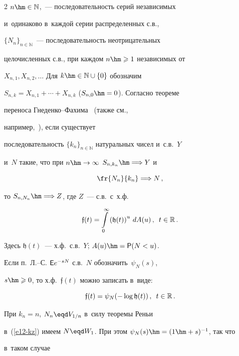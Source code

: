 \begin{multicols}{2}
$n\hm\in\mathbb{N}$,~--- последовательность серий независимых 


и~одинаково в~каждой серии распределенных с.в.,


$\{N_n\}_{n\in\mathbb{N}}$~--- последовательность неотрицательных


целочисленных с.в., при каждом $n\hm\geqslant1$ независимых от


$X_{n,1},X_{n,2},\ldots$ Для $k\hm\in\mathbb{N}\cup\{0\}$ обозначим


$S_{n,k}=X_{n,1}+\cdots+X_{n,k}$ ($S_{n,0}\hm=0$). Согласно теореме


переноса Гне\-ден\-ко--Фа\-хи\-ма~\cite{GnedenkoFahim1969} (также см.,


например,~\cite{GnedenkoKorolev1996}), если существует


последовательность $\{k_n\}_{n\in\mathbb{N}}$ натуральных чисел и~с.в.~$Y$ 


и~$N$ такие, что при $n\hm\to\infty$ $S_{n,k_n}\hm \Longrightarrow Y$ и


\begin{equation}


\fr{N_n}{k_n}\Longrightarrow N\,,\label{e12-kz}


\end{equation}


то $ S_{n,N_n}\hm\Longrightarrow Z$, где $Z$~--- с.в.\ с~х.ф.


$$


\mathfrak{f}(t)=\int\limits_{0}^{\infty}\left(\mathfrak{h}(t)\right)^u\,dA(u)\,,\enskip


t\in\mathbb{R}\,.


$$


Здесь $\mathfrak{h}(t)$~--- х.ф.\ с.в.~$Y$; $A(u)\hm={\sf P}(N<u)$.





Если п.~Л.--С. ${\sf E}e^{-sN}$ с.в.~$N$ обозначить~$\psi_N(s)$,


$s\hm\geqslant0$, то х.ф.~$\mathfrak{f}(t)$ можно записать в~виде:


$$


\mathfrak{f}(t)=\psi_N(-\log\mathfrak{h}(t))\,,\enskip t\in\mathbb{R}\,.


$$


При $k_n=n$, $N_n\eqd V_{1/n}$ в~силу теоремы Реньи~\cite{Renyi1956}


в~(\ref{e12-kz}) имеем $N\eqd W_1$. При этом $\psi_N(s)\hm=(1\hm+s)^{-1}$, так что 


в~таком случае



\end{multicols}
